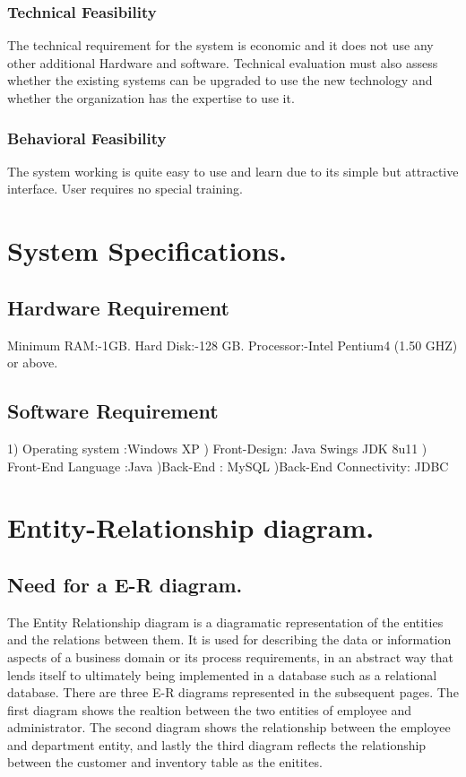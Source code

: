 \documentclass[12pt,a4paper]{report}
\begin{document}
\subsection{Technical Feasibility}
The technical requirement for the system is economic and it does not use any other additional Hardware and software. Technical evaluation must also assess whether the existing systems can be upgraded to use the new technology and whether the organization has the expertise to use it. 
\subsection{Behavioral Feasibility}
The system working is quite easy to use and learn due to its simple but attractive interface. User requires no special training.

\chapter{System Specifications.}%

\section{Hardware Requirement}
Minimum RAM:-1GB.
\newline Hard Disk:-128 GB.
\newline Processor:-Intel Pentium4 (1.50 GHZ) or above.

\section{Software Requirement}
1) Operating system :Windows XP
) Front-Design: Java Swings JDK 8u11
) Front-End Language :Java
)Back-End : MySQL
)Back-End Connectivity: JDBC

\chapter{Entity-Relationship diagram.}%

\section{Need for a E-R diagram.}
The Entity Relationship diagram is a diagramatic representation of the entities and the relations between them. It is used for describing the data or information aspects of a business domain or its process requirements, in an abstract way that lends itself to ultimately being implemented in a database such as a relational database. There are three E-R diagrams represented in the subsequent pages. The first diagram shows the realtion between the two entities of employee and administrator. The second diagram shows the relationship between the employee and department entity, and lastly the third diagram reflects the relationship between the customer and inventory table as the enitites.
\end{document}
